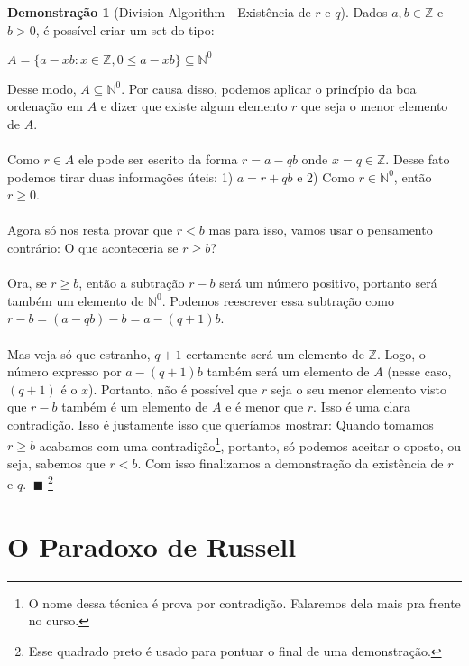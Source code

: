 \documentclass[a4paper,11pt,oneside]{book}
\theoremstyle{definition}
\theoremstyle{break}
\newtheorem{demonstration}{Demonstração}[section]
\begin{document}
\begin{demonstration}[\small Division Algorithm - Existência de $r$ e $q$]
Dados $a,b \in \mathbb{Z}$ e $b > 0$, é possível criar um set do tipo:
\begin{center}
	$ A = \{ a - xb : x \in \mathbb{Z}, 0 \leq a - xb \} \subseteq \mathbb{N}^0 $
\end{center}
Desse modo, $A \subseteq \mathbb{N}^0$. Por causa disso, podemos aplicar o princípio da boa ordenação em $A$ e dizer que existe algum elemento $r$ que seja o menor elemento de $A$.
\\
\\
Como $r \in A$ ele pode ser escrito da forma $r = a - qb$ onde $x = q \in \mathbb{Z}$. Desse fato podemos tirar duas informações úteis: 1) $a = r + qb$ e 2) Como $r \in \mathbb{N}^0$, então $r \geq 0$.
\\
\\
Agora só nos resta provar que $r < b$ mas para isso, vamos usar o pensamento contrário: O que aconteceria se $r \geq b$?
\\
\\
Ora, se $r \geq b$, então a subtração $r - b$ será um número positivo, portanto será também um elemento de $\mathbb{N}^0$. Podemos reescrever essa subtração como $r - b = (a - qb) - b = a - (q + 1)b$. 
\\
\\
Mas veja só que estranho, $q + 1$ certamente será um elemento de $\mathbb{Z}$. Logo, o número expresso por $a - (q + 1)b$ também será um elemento de $A$ (nesse caso, $(q + 1)$ é o $x$). Portanto, não é possível que $r$ seja o seu menor elemento visto que $r - b$ também é um elemento de $A$ e é menor que $r$. Isso é uma clara contradição. Isso é justamente isso que queríamos mostrar: Quando tomamos $r \geq b$ acabamos com uma contradição\footnote{O nome dessa técnica é prova por contradição. Falaremos dela mais pra frente no curso.}, portanto, só podemos aceitar o oposto, ou seja, sabemos que $r < b$. Com isso finalizamos a demonstração da existência de $r$ e $q$. $\ \blacksquare$ \footnote{Esse quadrado preto é usado para pontuar o final de uma demonstração.}
\end{demonstration}


\section{O Paradoxo de Russell}
\end{document}
